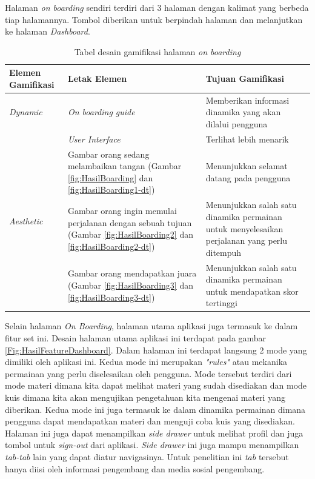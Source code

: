 Halaman \textit{on boarding} sendiri terdiri dari 3 halaman dengan kalimat yang berbeda tiap halamannya.
Tombol diberikan untuk berpindah halaman dan melanjutkan ke halaman \textit{Dashboard}.
\begin{table}[H]
	\caption{Tabel desain gamifikasi halaman \textit{on boarding}}
	\begin{tabular}{|p{3.6cm}|m{}|m{}|}
		\hline
		Elemen Gamifikasi& Letak Elemen & Tujuan Gamifikasi\\
		\hline
		\textit{Dynamic}&\textit{On boarding guide}&Memberikan informasi dinamika yang akan dilalui pengguna \\
		\hline
		\multirow{4}{1cm}{\textit{Aesthetic}}&\textit{User Interface}&Terlihat lebih menarik\\
		\cline{2-3}
		& Gambar orang sedang melambaikan tangan (Gambar \ref*{fig:HasilBoarding} dan \ref*{fig:HasilBoarding1-dt}) & Menunjukkan selamat datang pada pengguna \\
		\cline{2-3}
		& Gambar orang ingin memulai perjalanan dengan sebuah tujuan (Gambar \ref*{fig:HasilBoarding2} dan \ref*{fig:HasilBoarding2-dt}) & Menunjukkan salah satu dinamika permainan untuk menyelesaikan perjalanan yang perlu ditempuh \\
		\cline{2-3}
		& Gambar orang mendapatkan juara (Gambar \ref*{fig:HasilBoarding3} dan \ref*{fig:HasilBoarding3-dt}) & Menunjukkan salah satu dinamika permainan untuk mendapatkan skor tertinggi \\
		\hline
	\end{tabular}
\end{table}
Selain halaman \textit{On Boarding}, halaman utama aplikasi juga termasuk ke dalam fitur set ini. Desain halaman utama aplikasi ini terdapat pada gambar \ref*{Fig:HasilFeatureDashboard}.
Dalam halaman ini terdapat langsung 2 mode yang dimiliki oleh aplikasi ini. Kedua mode ini merupakan \textit{"rules"} atau mekanika permainan yang perlu diselesaikan oleh pengguna.
Mode tersebut terdiri dari mode materi dimana kita dapat melihat materi yang sudah disediakan dan mode kuis dimana kita akan mengujikan pengetahuan kita mengenai materi yang diberikan.
Kedua mode ini juga termasuk ke dalam dinamika permainan dimana pengguna dapat mendapatkan materi dan menguji coba kuis yang disediakan.
Halaman ini juga dapat menampilkan \textit{side drawer} untuk melihat profil dan juga tombol untuk \textit{sign-out} dari aplikasi.
\textit{Side drawer} ini juga mampu menampilkan \textit{tab-tab} lain yang dapat diatur navigasinya. Untuk penelitian ini \textit{tab} tersebut hanya diisi oleh informasi pengembang dan media sosial pengembang.


